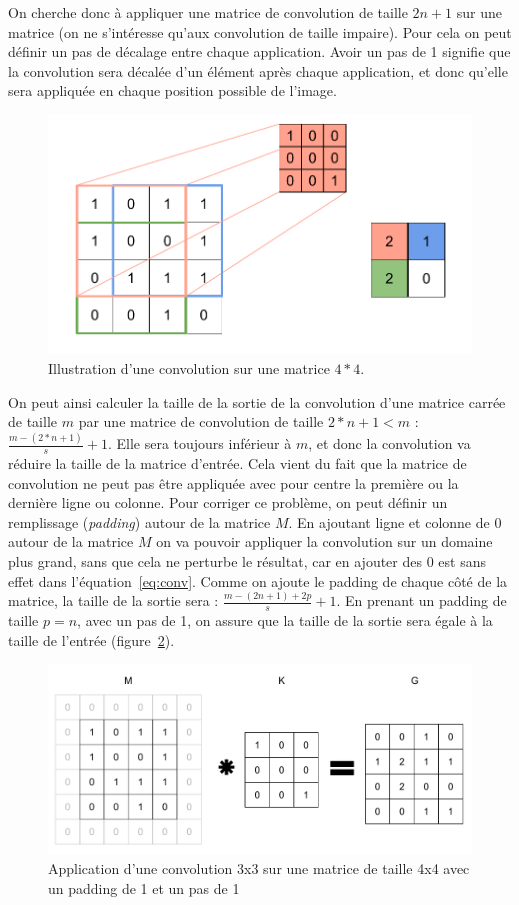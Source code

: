On cherche donc à appliquer une matrice de convolution de taille $2n+1$ sur une matrice (on ne s'intéresse qu'aux convolution de taille impaire).
Pour cela on peut définir un pas de décalage entre chaque application.
Avoir un pas de 1 signifie que la convolution sera décalée d'un élément après chaque application, et donc qu'elle sera appliquée en chaque position possible de l'image.

\begin{figure}%
\centering
\includegraphics[width=.6\columnwidth]{figures/convolution.pdf}%
\caption{Illustration d'une convolution sur une matrice $4*4$.}%
\label{fig:conv1}%
\end{figure}

On peut ainsi calculer la taille de la sortie de la convolution d'une matrice carrée de taille $m$ par une matrice de convolution de taille $2*n+1 < m$ : $\frac{m-(2*n+1)}{s} + 1$.
Elle sera toujours inférieur à $m$, et donc la convolution va réduire la taille de la matrice d'entrée.
Cela vient du fait que la matrice de convolution ne peut pas être appliquée avec pour centre la première ou la dernière ligne ou colonne.
Pour corriger ce problème, on peut définir un remplissage (\textit{padding}) autour de la matrice $M$.
En ajoutant ligne et colonne de 0 autour de la matrice $M$ on va pouvoir appliquer la convolution sur un domaine plus grand, sans que cela ne perturbe le résultat, car en ajouter des 0 est sans effet dans l'équation~\ref{eq:conv}.
Comme on ajoute le padding de chaque côté de la matrice, la taille de la sortie sera : $\frac{m-(2n+1)+2p}{s} + 1$.
En prenant un padding de taille $p=n$, avec un pas de 1, on assure que la taille de la sortie sera égale à la taille de l'entrée (figure~\ref{fig:convpad}).

\begin{figure}%
\centering
\includegraphics[width=\columnwidth]{figures/convolutionpadding.pdf}%
\caption{Application d'une convolution 3x3 sur une matrice de taille 4x4 avec un padding de 1 et un pas de 1}%
\label{fig:convpad}%
\end{figure}

